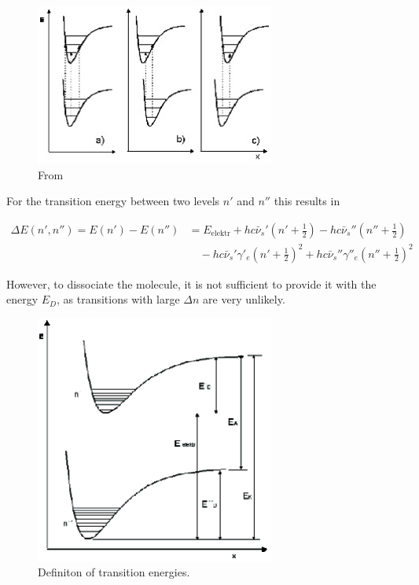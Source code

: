 \documentclass{article}
\begin{document}
\begin{figure}[h!]
	\centering
	\includegraphics[width=0.7\textwidth]{Figures/Introduction/Combined.jpg}
	\caption{From \cite{riede_optical}}
\end{figure}

For the transition energy between two levels $n'$ and $n''$ this results in

\begin{align*}
	\Delta E(n', n'') = E(n') - E(n'') &= E_{\text{elektr}} + hc\bar{\nu}_s' \left(n' + \frac{1}{2}\right) 
	- hc\bar{\nu}_s'' \left(n'' + \frac{1}{2}\right) \nonumber \\
	&\quad - hc\bar{\nu}_s'\gamma'_e \left(n' + \frac{1}{2}\right)^2 
	+ hc\bar{\nu}_s''\gamma''_e \left(n'' + \frac{1}{2}\right)^2
\end{align*}
	
However, to dissociate the molecule, it is not sufficient to provide it with the energy $E_D$, as transitions with large $\Delta n$ are very unlikely.
	
\begin{figure}[h!]
	\centering
	\includegraphics[width=0.7\textwidth]{Figures/Introduction/Energies.png}
	\caption{Definiton of transition energies. \cite{riede_optical}}
	\label{fig:Dissociation}
\end{figure}
\end{document}
